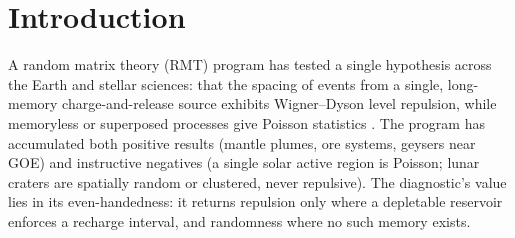 \documentclass[12pt,a4paper]{article}
\begin{document}
\begin{abstract}
\vspace{0.8em}
\noindent\textbf{Keywords:} random matrix theory; geomagnetic reversals; geodynamo; polarity timescale; level repulsion; cryptochrons; charge-and-release; memory

\vspace{0.4em}
\noindent\textbf{Code and data:} \url{https://github.com/Ruqing1963/geomagnetic-reversal-rmt}

\vspace{0.2em}
\noindent\textbf{Companion studies:} stratigraphy \url{https://zenodo.org/records/20774581}; seismotectonics \url{https://zenodo.org/records/20768130}; mantle plumes \url{https://zenodo.org/records/20768420}; metallogeny \url{https://zenodo.org/records/20768849}; evolution \url{https://zenodo.org/records/20783763}; hydrogeology \url{https://zenodo.org/records/20780389}; solar flares \url{https://zenodo.org/records/20784967}; orbital architecture \url{https://zenodo.org/records/20785613}; lunar craters \url{https://zenodo.org/records/20787412}
\end{abstract}

\section{Introduction}

A random matrix theory (RMT) program has tested a single hypothesis across the Earth and stellar sciences: that the spacing of events from a single, long-memory charge-and-release source exhibits Wigner--Dyson level repulsion, while memoryless or superposed processes give Poisson statistics \citep{chen2026plume,chen2026metal,chen2026solar,chen2026lunar}. The program has accumulated both positive results (mantle plumes, ore systems, geysers near GOE) and instructive negatives (a single solar active region is Poisson; lunar craters are spatially random or clustered, never repulsive). The diagnostic's value lies in its even-handedness: it returns repulsion only where a depletable reservoir enforces a recharge interval, and randomness where no such memory exists.
\end{document}
